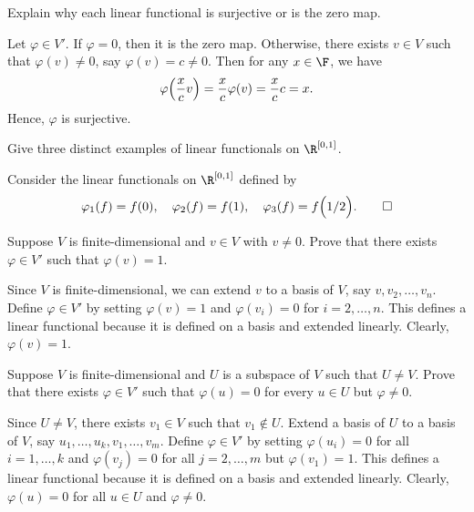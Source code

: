 \begin{exc}

\begin{exercise}
Explain why each linear functional is surjective or is the zero map.
\end{exercise}
\begin{solution}

Let $\varphi\in V'$. If $\varphi=0$, then it is the zero map. Otherwise, there
exists $v\in V$ such that $\varphi(v)\ne0$, say $\varphi(v)=c\ne0$. Then for any
$x\in\F$, we have
\[ \varphi\Bigl(\frac{x}{c}v\Bigr) = \frac{x}{c}\varphi(v) = \frac{x}{c}c = x. \]
Hence, $\varphi$ is surjective.
\end{solution}

\begin{exercise}
Give three distinct examples of linear functionals on $\R^{[0,1]}$.
\end{exercise}
\begin{solution}
Consider the linear functionals on $\R^{[0,1]}$ defined by
\[ \varphi_1(f)=f(0), \quad \varphi_2(f)=f(1), \quad
   \varphi_3(f)=f\Bigl(1/2\Bigr). \qedhere \]
\end{solution}

\begin{exercise}
Suppose $V$ is finite-dimensional and $v\in V$ with $v\ne0$. Prove that there
exists $\varphi\in V'$ such that $\varphi(v)=1$.
\end{exercise}
\begin{solution}
Since $V$ is finite-dimensional, we can extend $v$ to a basis of $V$, say
$v,v_2,\dots,v_n$. Define $\varphi\in V'$ by setting $\varphi(v)=1$ and
$\varphi(v_i)=0$ for $i=2,\dots,n$. This defines a linear functional because it
is defined on a basis and extended linearly. Clearly, $\varphi(v)=1$.
\end{solution}

\begin{exercise}
Suppose $V$ is finite-dimensional and $U$ is a subspace of $V$ such that
$U\ne V$. Prove that there exists $\varphi\in V'$ such that $\varphi(u)=0$ for
every $u\in U$ but $\varphi\ne0$.
\end{exercise}
\begin{solution}
Since $U\ne V$, there exists $v_1\in V$ such that $v_1\notin U$. Extend a basis
of $U$ to a basis of $V$, say $u_1,\dots,u_k,v_1,\dots,v_m$. Define
$\varphi\in V'$ by setting $\varphi(u_i)=0$ for all $i=1,\dots,k$ and
$\varphi(v_j)=0$ for all $j=2,\dots,m$ but $\varphi(v_1)=1$. This defines a
linear functional because it is defined on a basis and extended linearly.
Clearly, $\varphi(u)=0$ for all $u\in U$ and $\varphi\ne0$.
\end{solution}


\end{exc}
